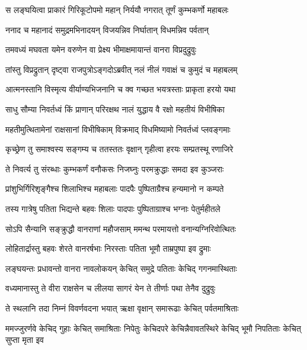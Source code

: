 
\twolineshloka
{स लङ्घयित्वा प्राकारं गिरिकूटोपमो महान्}
{निर्ययौ नगरात् तूर्णं कुम्भकर्णो महाबलः} %

\twolineshloka
{ननाद च महानादं समुद्रमभिनादयन्}
{विजयन्निव निर्घातान् विधमन्निव पर्वतान्} %

\twolineshloka
{तमवध्यं मघवता यमेन वरुणेन वा}
{प्रेक्ष्य भीमाक्षमायान्तं वानरा विप्रदुद्रुवुः} %

\twolineshloka
{तांस्तु विप्रद्रुतान् दृष्ट्वा राजपुत्रोऽङ्गदोऽब्रवीत्}
{नलं नीलं गवाक्षं च कुमुदं च महाबलम्} %

\twolineshloka
{आत्मनस्तानि विस्मृत्य वीर्याण्यभिजनानि च}
{क्व गच्छत भयत्रस्ताः प्राकृता हरयो यथा} %

\twolineshloka
{साधु सौम्या निवर्तध्वं किं प्राणान् परिरक्षथ}
{नालं युद्धाय वै रक्षो महतीयं विभीषिका} %

\twolineshloka
{महतीमुत्थितामेनां राक्षसानां विभीषिकाम्}
{विक्रमाद् विधमिष्यामो निवर्तध्वं प्लवङ्गमाः} %

\twolineshloka
{कृच्छ्रेण तु समाश्वस्य सङ्गम्य च ततस्ततः}
{वृक्षान् गृहीत्वा हरयः सम्प्रतस्थू रणाजिरे} %

\twolineshloka
{ते निवर्त्य तु संरब्धाः कुम्भकर्णं वनौकसः}
{निजघ्नुः परमक्रुद्धाः समदा इव कुञ्जराः} %

\twolineshloka
{प्रांशुभिर्गिरिशृङ्गैश्च शिलाभिश्च महाबलाः}
{पादपैः पुष्पिताग्रैश्च हन्यमानो न कम्पते} %

\twolineshloka
{तस्य गात्रेषु पतिता भिद्यन्ते बहवः शिलाः}
{पादपाः पुष्पिताग्राश्च भग्नाः पेतुर्महीतले} %

\twolineshloka
{सोऽपि सैन्यानि सङ्क्रुद्धौ वानराणां महौजसाम्}
{ममन्थ परमायत्तो वनान्यग्निरिवोत्थितः} %

\twolineshloka
{लोहितार्द्रास्तु बहवः शेरते वानरर्षभाः}
{निरस्ताः पतिता भूमौ ताम्रपुष्पा इव द्रुमाः} %

\twolineshloka
{लङ्घयन्तः प्रधावन्तो वानरा नावलोकयन्}
{केचित् समुद्रे पतिताः केचिद् गगनमास्थिताः} %

\twolineshloka
{वध्यमानास्तु ते वीरा राक्षसेन च लीलया}
{सागरं येन ते तीर्णाः पथा तेनैव दुद्रुवुः} %

\twolineshloka
{ते स्थलानि तदा निम्नं विवर्णवदना भयात्}
{ऋक्षा वृक्षान् समारूढाः केचित् पर्वतमाश्रिताः} %

\threelineshloka
{ममज्जुरर्णवे केचिद् गुहाः केचित् समाश्रिताः}
{निपेतुः केचिदपरे केचिन्नैवावतस्थिरे}
{केचिद् भूमौ निपतिताः केचित् सुप्ता मृता इव} %

